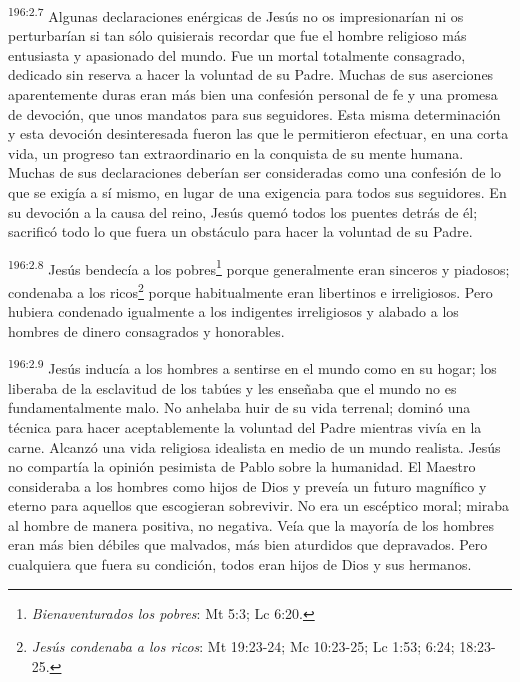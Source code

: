 \par 
\textsuperscript{196:2.7} Algunas declaraciones enérgicas de Jesús no os impresionarían ni os perturbarían si tan sólo quisierais recordar que fue el hombre religioso más entusiasta y apasionado del mundo. Fue un mortal totalmente consagrado, dedicado sin reserva a hacer la voluntad de su Padre. Muchas de sus aserciones aparentemente duras eran más bien una confesión personal de fe y una promesa de devoción, que unos mandatos para sus seguidores. Esta misma determinación y esta devoción desinteresada fueron las que le permitieron efectuar, en una corta vida, un progreso tan extraordinario en la conquista de su mente humana. Muchas de sus declaraciones deberían ser consideradas como una confesión de lo que se exigía a sí mismo, en lugar de una exigencia para todos sus seguidores. En su devoción a la causa del reino, Jesús quemó todos los puentes detrás de él; sacrificó todo lo que fuera un obstáculo para hacer la voluntad de su Padre.

\par 
\textsuperscript{196:2.8} Jesús bendecía a los pobres\footnote{\textit{Bienaventurados los pobres}: Mt 5:3; Lc 6:20.} porque generalmente eran sinceros y piadosos; condenaba a los ricos\footnote{\textit{Jesús condenaba a los ricos}: Mt 19:23-24; Mc 10:23-25; Lc 1:53; 6:24; 18:23-25.} porque habitualmente eran libertinos e irreligiosos. Pero hubiera condenado igualmente a los indigentes irreligiosos y alabado a los hombres de dinero consagrados y honorables.

\par 
\textsuperscript{196:2.9} Jesús inducía a los hombres a sentirse en el mundo como en su hogar; los liberaba de la esclavitud de los tabúes y les enseñaba que el mundo no es fundamentalmente malo. No anhelaba huir de su vida terrenal; dominó una técnica para hacer aceptablemente la voluntad del Padre mientras vivía en la carne. Alcanzó una vida religiosa idealista en medio de un mundo realista. Jesús no compartía la opinión pesimista de Pablo sobre la humanidad. El Maestro consideraba a los hombres como hijos de Dios y preveía un futuro magnífico y eterno para aquellos que escogieran sobrevivir. No era un escéptico moral; miraba al hombre de manera positiva, no negativa. Veía que la mayoría de los hombres eran más bien débiles que malvados, más bien aturdidos que depravados. Pero cualquiera que fuera su condición, todos eran hijos de Dios y sus hermanos.

